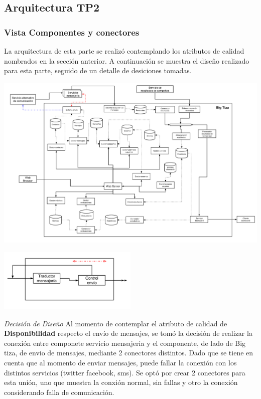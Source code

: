 \documentclass[a4paper, 11pt]{article}
\begin{document}
\newpage
\subsection{Arquitectura TP2}
\subsubsection{Vista Componentes y conectores}
La arquitectura de esta parte se realizó contemplando los atributos de calidad nombrados en la sección anterior. A continuación se muestra el diseño realizado para esta parte, seguido de un detalle de desiciones tomadas.

\centerline{\includegraphics[width=1.1\textwidth]{./diagramas/VistaCompyCon.png}}
\centerline{\includegraphics[width=0.5\textwidth]{./diagramas/ArqTP2Envio.png}}

\emph{Decisión de Diseño} Al momento de contemplar el atributo de calidad de \textbf{Disponibilidad} respecto el envío de mensajes, se tomó la decisión de realizar la conexión entre componete servicio mensajeria  y el componente, de lado de Big tiza, de envio de mensajes, mediante 2 conectores distintos. Dado que se tiene en cuenta que al momento  de enviar mensajes, puede fallar la conexión con los distintos servicios (twitter facebook, sms). 
Se optó por crear 2 conectores para esta unión, uno que muestra la conxión normal, sin fallas y otro la conexión considerando falla de comunicación.\\
\end{document}
